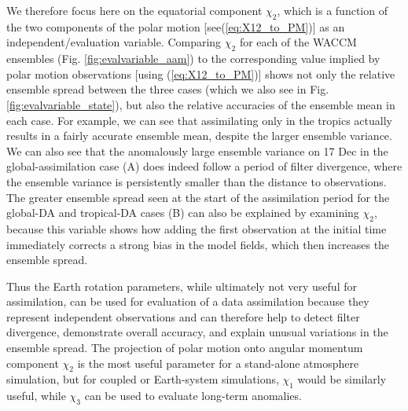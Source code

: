 We therefore focus here on the equatorial component $\chi_2$, which is a function of the two components of the polar motion [see(\ref{eq:X12_to_PM})] as an independent/evaluation variable. 
Comparing $\chi_2$ for each of the WACCM ensembles (Fig. \ref{fig:evalvariable_aam}) to the corresponding value implied by polar motion observations [using (\ref{eq:X12_to_PM})] 
shows not only the relative ensemble spread between the three cases (which we also see in Fig. \ref{fig:evalvariable_state}), but also the relative accuracies of the ensemble mean in each case. 
For example, we can see that assimilating only in the tropics actually results in a fairly accurate ensemble mean, despite the larger ensemble variance. 
We can also see that the anomalously large ensemble variance on 17 Dec in the global-assimilation case (A) does indeed follow a period of filter divergence, where the ensemble variance is persistently smaller than the distance to observations. 
The greater ensemble spread seen at the start of the assimilation period for the global-DA and tropical-DA cases (B) can also be explained by examining $\chi_2$, because this variable shows how adding the first observation at the initial time immediately corrects 
a strong bias in the model fields, which then increases the ensemble spread. 

Thus the Earth rotation parameters, while ultimately not very useful for assimilation, can be used for evaluation of a data assimilation because they represent independent observations and can therefore help to detect filter divergence, demonstrate overall accuracy, and explain unusual variations in the ensemble spread. 
The projection of polar motion onto angular momentum component $\chi_2$ is the most useful parameter for a stand-alone atmosphere simulation, but for coupled or Earth-system simulations, $\chi_1$ would be similarly useful, while $\chi_3$ can be used to evaluate long-term anomalies. 
